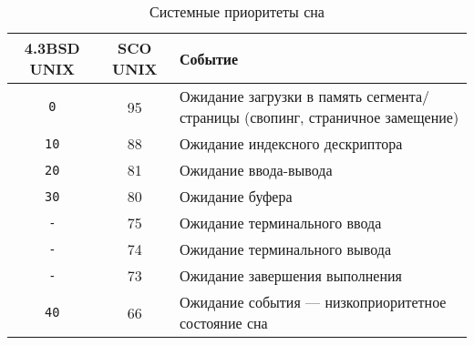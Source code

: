 \begin{table}[h]
	\begin{center}
		\begin{threeparttable}
			\caption{Системные приоритеты сна}
			\label{tbl:sbsd}
			\begin{tabular}{ |c|c|p{9cm}|  }
				\hline
				\textbf{4.3BSD UNIX} & \textbf{SCO UNIX} & \textbf{Событие} \\
				\hline
				\texttt{0} & 95 & Ожидание загрузки в память сегмента/страницы (свопинг, страничное замещение) \\
				\hline
				\texttt{10} & 88 & Ожидание индексного дескриптора \\
				\hline
				\texttt{20} & 81 & Ожидание ввода-вывода \\
				\hline
				\texttt{30} & 80 & Ожидание буфера \\
				\hline
				\texttt{-} & 75 & Ожидание терминального ввода \\
				\hline
				\texttt{-} & 74 & Ожидание терминального вывода \\
				\hline
				\texttt{-} & 73 & Ожидание завершения выполнения \\
				\hline
				\texttt{40} & 66 & Ожидание события --- низкоприоритетное состояние сна \\
				\hline
			\end{tabular}
		\end{threeparttable}
	\end{center}

	\vspace{1cm} %
	

\end{table}
